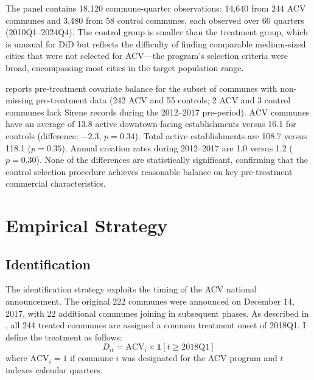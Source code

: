 \documentclass[12pt]{article}
\begin{document}
The panel contains 18,120 commune-quarter observations: 14,640 from 244 ACV communes and 3,480 from 58 control communes, each observed over 60 quarters (2010Q1--2024Q4). The control group is smaller than the treatment group, which is unusual for DiD but reflects the difficulty of finding comparable medium-sized cities that were not selected for ACV---the program's selection criteria were broad, encompassing most cities in the target population range.

 reports pre-treatment covariate balance for the subset of communes with non-missing pre-treatment data (242 ACV and 55 controls; 2 ACV and 3 control communes lack Sirene records during the 2012--2017 pre-period). ACV communes have an average of 13.8 active downtown-facing establishments versus 16.1 for controls (difference: $-2.3$, $p = 0.34$). Total active establishments are 108.7 versus 118.1 ($p = 0.35$). Annual creation rates during 2012--2017 are 1.0 versus 1.2 ($p = 0.30$). None of the differences are statistically significant, confirming that the control selection procedure achieves reasonable balance on key pre-treatment commercial characteristics.




\section{Empirical Strategy}
\label{sec:strategy}

\subsection{Identification}

The identification strategy exploits the timing of the ACV national announcement. The original 222 communes were announced on December 14, 2017, with 22 additional communes joining in subsequent phases. As described in , all 244 treated communes are assigned a common treatment onset of 2018Q1. I define the treatment as follows:
\begin{equation}
D_{it} = \text{ACV}_i \times \mathbf{1}[t \geq 2018\text{Q1}]
\end{equation}
where $\text{ACV}_i = 1$ if commune $i$ was designated for the ACV program and $t$ indexes calendar quarters.
\end{document}
